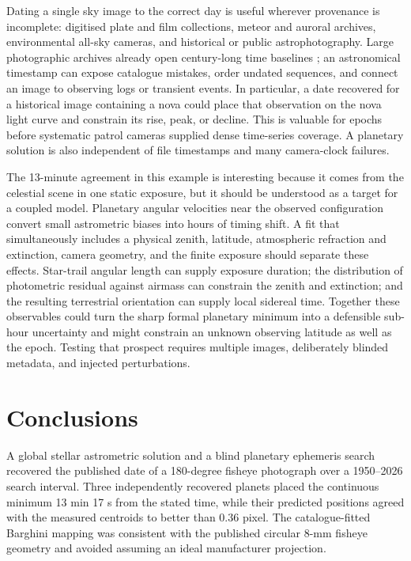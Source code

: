 \documentclass{aa}
\begin{document}
Dating a single sky image to the correct day is useful wherever provenance is
incomplete: digitised plate and film collections, meteor and auroral archives,
environmental all-sky cameras, and historical or public astrophotography. Large
photographic archives already open century-long time baselines
\citep{Grindlay2009}; an astronomical timestamp can expose catalogue mistakes,
order undated sequences, and connect an image to observing logs or transient
events. In particular, a date recovered for a historical image containing a
nova could place that observation on the nova light curve and constrain its
rise, peak, or decline. This is valuable for epochs before systematic patrol
cameras supplied dense time-series coverage. A planetary solution is also
independent of file timestamps and many camera-clock failures.

The 13-minute agreement in this example is interesting because it comes from
the celestial scene in one static exposure, but it should be understood as a
target for a coupled model. Planetary angular velocities near the observed
configuration convert small astrometric biases into hours of timing shift. A
fit that simultaneously includes a physical zenith, latitude, atmospheric
refraction and extinction, camera geometry, and the finite exposure should
separate these effects. Star-trail angular length can supply exposure duration;
the distribution of photometric residual against airmass can constrain the
zenith and extinction; and the resulting terrestrial orientation can supply
local sidereal time. Together these observables could turn the sharp formal
planetary minimum into a defensible sub-hour uncertainty and might constrain an
unknown observing latitude as well as the epoch. Testing that prospect requires
multiple images, deliberately blinded metadata, and injected perturbations.

\section{Conclusions}

A global stellar astrometric solution and a blind planetary ephemeris search
recovered the published date of a 180-degree fisheye photograph over a
1950--2026 search interval. Three independently recovered planets placed the
continuous minimum 13 min 17 s from the stated time, while their predicted
positions agreed with the measured centroids to better than 0.36 pixel. The
catalogue-fitted Barghini mapping was consistent with the published circular
8-mm fisheye geometry and avoided assuming an ideal manufacturer projection.
\end{document}
